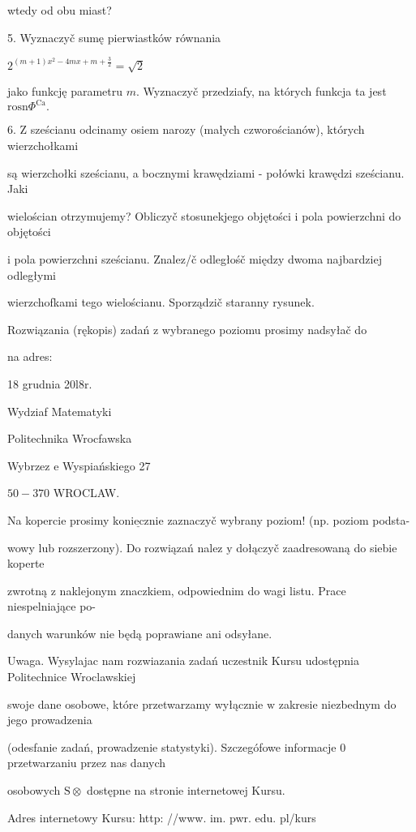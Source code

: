 \documentclass[a4paper,12pt]{article}
\begin{document}
wtedy od obu miast?

5. Wyznaczyč sumę pierwiastków równania

$2^{(m+1)x^{2}-4mx+m+\frac{3}{2}}=\sqrt{2}$

jako funkcję parametru $m$. Wyznaczyč przedziafy, na których funkcja ta jest $\mathrm{r}\mathrm{o}\mathrm{s}\mathrm{n}\Phi^{\mathrm{C}\mathrm{a}}.$

6. $\mathrm{Z}$ sześcianu odcinamy osiem narozy (małych czworościanów), których wierzchołkami

są wierzchołki sześcianu, a bocznymi krawędziami - połówki krawędzi sześcianu. Jaki

wielościan otrzymujemy? Obliczyč stosunekjego objętości $\mathrm{i}$ pola powierzchni do objętości

$\mathrm{i}$ pola powierzchni sześcianu. Znalez/č odległośč między dwoma najbardziej odległymi

wierzchofkami tego wielościanu. Sporządzič staranny rysunek.

Rozwiązania (rękopis) zadań z wybranego poziomu prosimy nadsyłač do

na adres:

18 grudnia 20l8r.

Wydziaf Matematyki

Politechnika Wrocfawska

Wybrzez $\mathrm{e}$ Wyspiańskiego 27

$50-370$ WROCLAW.

Na kopercie prosimy $\underline{\mathrm{k}\mathrm{o}\mathrm{n}\mathrm{i}\mathrm{e}\mathrm{c}\mathrm{z}\mathrm{n}\mathrm{i}\mathrm{e}}$ zaznaczyč wybrany poziom! (np. poziom podsta-

wowy lub rozszerzony). Do rozwiązań nalez $\mathrm{y}$ dołączyč zaadresowaną do siebie koperte

zwrotną $\mathrm{z}$ naklejonym znaczkiem, odpowiednim do wagi listu. Prace niespelniające po-

danych warunków nie będą poprawiane ani odsyłane.

Uwaga. Wysylajac nam rozwiazania zadań uczestnik Kursu udostępnia Politechnice Wroclawskiej

swoje dane osobowe, które przetwarzamy wyłącznie $\mathrm{w}$ zakresie niezbednym do jego prowadzenia

(odesfanie zadań, prowadzenie statystyki). Szczegófowe informacje $0$ przetwarzaniu przez nas danych

osobowych $\mathrm{S}\otimes$ dostępne na stronie internetowej Kursu.

Adres internetowy Kursu: http: //www. im. pwr. edu. pl/kurs
\end{document}
